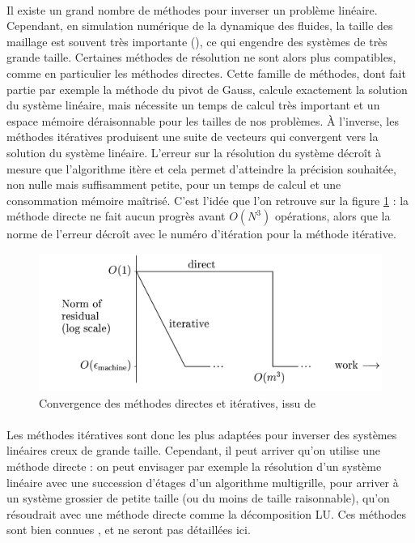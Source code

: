 	\paragraph{}
	Il existe un grand nombre de méthodes pour inverser un problème linéaire.
	Cependant, en simulation numérique de la dynamique des fluides, la taille des maillage est souvent très importante (), ce qui engendre des systèmes de très grande taille.
	Certaines méthodes de résolution ne sont alors plus compatibles, comme en particulier les méthodes directes.
	Cette famille de méthodes, dont fait partie par exemple la méthode du pivot de Gauss, calcule exactement la solution du système linéaire, mais nécessite un temps de calcul très important et un espace mémoire déraisonnable pour les tailles de nos problèmes.
	À l'inverse, les méthodes itératives produisent une suite de vecteurs qui convergent vers la solution du système linéaire.
	L'erreur sur la résolution du système décroît à mesure que l'algorithme itère et cela permet d'atteindre la précision souhaitée, non nulle mais suffisamment petite, pour un temps de calcul et une consommation mémoire maîtrisé.
	C'est l'idée que l'on retrouve sur la figure \ref{fig:direct-iterative} : la méthode directe ne fait aucun progrès avant $O\left(N^3\right)$ opérations, alors que la norme de l'erreur décroît avec le numéro d'itération pour la méthode itérative.

	\begin{figure}
		\centering
		\includegraphics[width=.7\textwidth]{images/direct-iterative.png}
		\caption{Convergence des méthodes directes et itératives, issu de \cite{TrefethenBau1997}}
		\label{fig:direct-iterative}
	\end{figure}

	\paragraph{}
	Les méthodes itératives sont donc les plus adaptées pour inverser des systèmes linéaires creux de grande taille.
	Cependant, il peut arriver qu'on utilise une méthode directe : on peut envisager par exemple la résolution d'un système linéaire avec une succession d'étages d'un algorithme multigrille, pour arriver à un système grossier de petite taille (ou du moins de taille raisonnable), qu'on résoudrait avec une méthode directe comme la décomposition LU.
	Ces méthodes sont bien connues \cite{TrefethenBau1997}, et ne seront pas détaillées ici.



